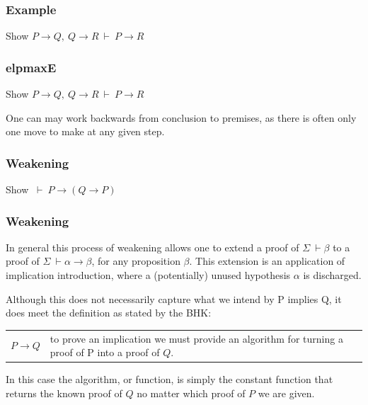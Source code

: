 \documentclass{beamer}
\begin{document}
\begin{frame}
	\frametitle{Example}
	
	Show $P \rightarrow Q, \ Q \rightarrow R \ \vdash \ P \rightarrow R$
	
	\vspace{70mm}
	
\end{frame}

\begin{frame}
	\frametitle{elpmaxE}
	
	Show $P \rightarrow Q, \ Q \rightarrow R \ \vdash \ P \rightarrow R$
	
	\vspace{60mm}
	
	One can may work backwards from conclusion to premises, as there is often only one move to make at any given step.
	
\end{frame}

\begin{frame}
	\frametitle{Weakening}
	
	Show $\ \vdash \ P \to (Q \to P)$
	
	\vspace{70mm}	

\end{frame}

\begin{frame}
	\frametitle{Weakening}
	
	In general this process of weakening allows one to extend a proof of $\Sigma \ \vdash \beta$ to a proof of $\Sigma \ \vdash \alpha \to \beta$, for any proposition $\beta$. This extension is an application of implication introduction, where a (potentially) unused hypothesis $\alpha$ is discharged. 
	
	Although this does not necessarily capture what we intend by P implies Q, it does meet the definition as stated by the BHK:
	
	\begin{center}
	    \begin{tabular}{p{15mm}p{8cm}}  
	      $P \to Q$ & to prove an implication we must provide an algorithm for turning a proof of P into a proof of $Q$.\\
	    \end{tabular}
  \end{center}
	
	In this case the algorithm, or function, is simply the constant function that returns the known proof of $Q$ no matter which proof of $P$ we are given. 
	

\end{frame}
\end{document}
